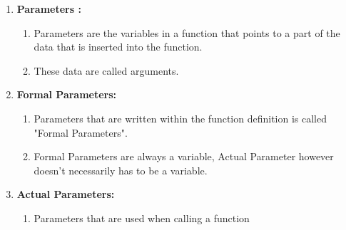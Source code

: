 \begin{enumerate}
    \item  \textbf{Parameters :}
\begin{enumerate}
    \item Parameters are the variables in a function that 
    points to a part of the data that is 
    inserted into the function.
    \item These data are called arguments.
	
\end{enumerate}

\item \textbf{Formal Parameters:}
\begin{enumerate}
    \item Parameters that are written within the 
    function definition is called "Formal Parameters".

	\item Formal Parameters are always a variable, 
    Actual Parameter however doesn't necessarily has 
    to be a variable.
	
\end{enumerate}


\item \textbf{Actual Parameters:}
\begin{enumerate}
	
    \item Parameters that are used when calling a function
    

\end{enumerate}
\end{enumerate}
